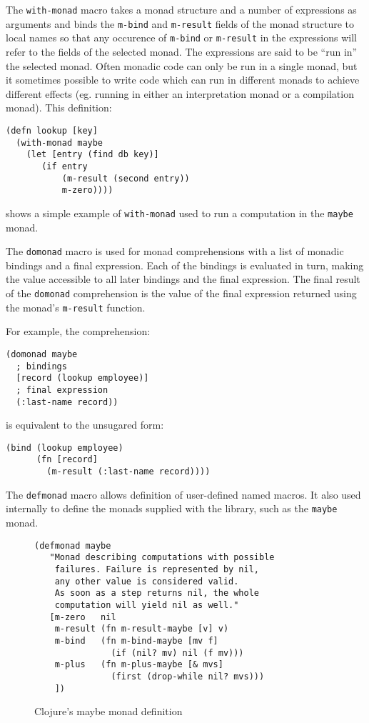 \documentclass[natbib,10pt]{sigplanconf}
\begin{document}
The {\tt with-monad} macro takes a monad structure and a number of
expressions as arguments and binds the {\tt m-bind} and {\tt m-result}
fields of the monad structure to local names so that any occurence of
{\tt m-bind} or {\tt m-result} in the expressions will refer to the
fields of the selected monad.  The expressions are said to be ``run
in'' the selected monad.  Often monadic code can only be run in a
single monad, but it sometimes possible to write code which can run in
different monads to achieve different effects (eg. running in either
an interpretation monad or a compilation monad).  This definition:
\begin{verbatim}
(defn lookup [key]
  (with-monad maybe
    (let [entry (find db key)]
       (if entry
           (m-result (second entry))
           m-zero))))
\end{verbatim}
shows a simple example of {\tt with-monad} used to run a computation
in the {\tt maybe} monad.

The {\tt domonad} macro is used for monad comprehensions with a list
of monadic bindings and a final expression.  Each of the bindings is
evaluated in turn, making the value accessible to all later bindings
and the final expression.  The final result of the {\tt domonad}
comprehension is the value of the final expression returned using
the monad's {\tt m-result} function.

For example, the comprehension:
\begin{verbatim}
(domonad maybe
  ; bindings
  [record (lookup employee)]
  ; final expression
  (:last-name record))
\end{verbatim}
is equivalent to the unsugared form:
\begin{verbatim}
(bind (lookup employee)
      (fn [record]
        (m-result (:last-name record))))
\end{verbatim}

The {\tt defmonad} macro allows definition of user-defined named
macros.  It also used internally to define the monads supplied
with the library, such as the {\tt maybe} monad.

\begin{figure}
\begin{center}
\begin{verbatim}
(defmonad maybe
   "Monad describing computations with possible
    failures. Failure is represented by nil,
    any other value is considered valid.
    As soon as a step returns nil, the whole
    computation will yield nil as well."
   [m-zero   nil
    m-result (fn m-result-maybe [v] v)
    m-bind   (fn m-bind-maybe [mv f]
               (if (nil? mv) nil (f mv)))
    m-plus   (fn m-plus-maybe [& mvs]
               (first (drop-while nil? mvs)))
    ])

\end{verbatim}
\end{center}
\caption{Clojure's maybe monad definition}
\label{fig-Clojure-maybe-defn}
\end{figure}
\end{document}
